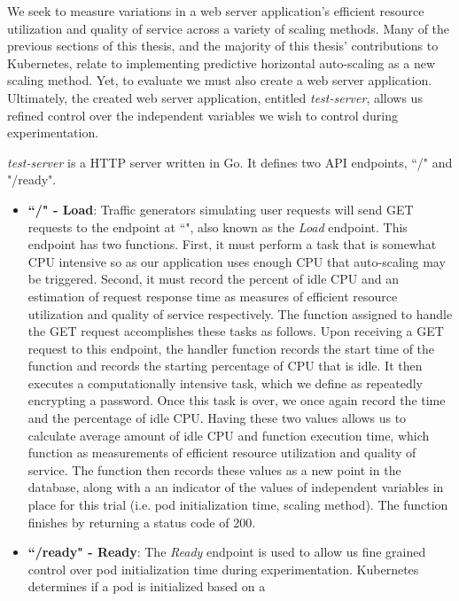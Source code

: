 We seek to measure variations in a web server application's
efficient resource utilization and quality of service across a variety of
scaling methods. Many of the previous sections of this thesis, and the majority
of this thesis' contributions to Kubernetes, relate to implementing predictive
horizontal auto-scaling as a new scaling method. Yet, to evaluate we must also
create a web server application. Ultimately, the created web server application,
entitled \textit{test-server}, allows us refined control over the independent
variables we wish to control during experimentation.

\textit{test-server} is a HTTP server written in Go. It defines two API
endpoints, ``/" and "/ready".

\begin{itemize}
  \item \textbf{``/" - Load}: Traffic generators simulating user requests will
    send GET requests to the endpoint at ``\/", also known as the \textit{Load} endpoint.
    This endpoint has two functions. First, it must perform a task that is
    somewhat CPU intensive so as our application uses enough CPU that
    auto-scaling may be triggered. Second, it must record the percent of idle CPU
    and an estimation of request response time as measures of
    efficient resource utilization and quality of service respectively. The
    function assigned to handle the GET request accomplishes these tasks as
    follows. Upon receiving a GET request to this endpoint, the handler function
    records the start time of the function and records the starting percentage
    of CPU that is idle. It then executes a computationally intensive
    task, which we define as repeatedly encrypting a password. Once this task
    is over, we once again record the time and the percentage of idle CPU.
    Having these two values allows us to calculate average amount of idle CPU
    and function execution time, which function as measurements of
    efficient resource utilization and quality of service. The function then
    records these values as a new point in the database, along with a
    an indicator of the values of independent variables in place for this trial
    (i.e. pod initialization time, scaling method). The function finishes by
    returning a status code of 200.
  \item \textbf{``/ready" - Ready}: The \textit{Ready} endpoint is used to allow
    us fine grained control over pod initialization time during experimentation.
    Kubernetes determines if a pod is initialized based on a

\end{itemize}
